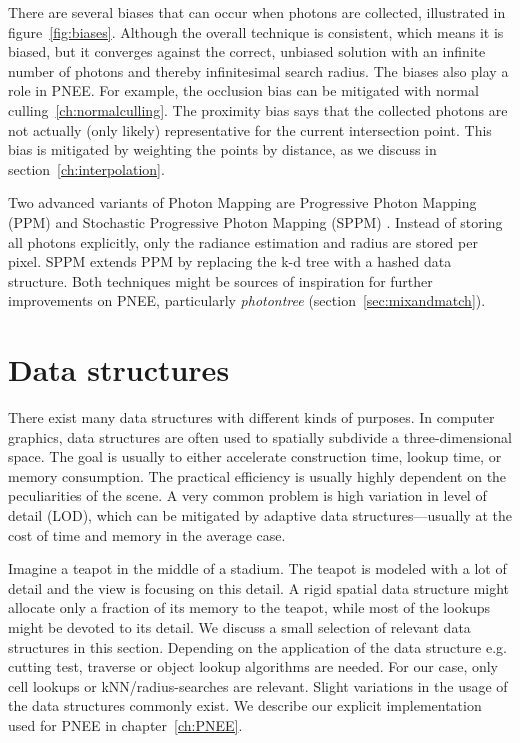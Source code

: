 There are several biases that can occur when photons are collected, illustrated in figure~\ref{fig:biases}. Although the overall technique is consistent, which means it is biased, but it converges against the correct, unbiased solution with an infinite number of photons and thereby infinitesimal search radius. The biases also play a role in PNEE. For example, the occlusion bias can be mitigated with normal culling~\ref{ch:normalculling}. The proximity bias says that the collected photons are not actually (only likely) representative for the current intersection point. This bias is mitigated by weighting the points by distance, as we discuss in section~\ref{ch:interpolation}. 

Two advanced variants of Photon Mapping are Progressive Photon Mapping (PPM) \parencite{DBLP:journals/tog/HachisukaOJ08} and Stochastic Progressive Photon Mapping (SPPM) \parencite{DBLP:journals/tog/HachisukaJ09}. Instead of storing all photons explicitly, only the radiance estimation and radius are stored per pixel. SPPM extends PPM by replacing the k-d tree with a hashed data structure. Both techniques might be  sources of inspiration for further improvements on PNEE, particularly \textit{photontree} (section~\ref{sec:mixandmatch}).

\section{Data structures}

There exist many data structures with different kinds of purposes. In computer graphics, data structures are often used to spatially subdivide a three-dimensional space. The goal is usually to either accelerate construction time, lookup time, or memory consumption. The practical efficiency is usually highly dependent on the peculiarities of the scene. A very common problem is high variation in level of detail (LOD), which can be mitigated by adaptive data structures---usually at the cost of time and memory in the average case. 

Imagine a teapot in the middle of a stadium. The teapot is modeled with a lot of detail and the view is focusing on this detail. A rigid spatial data structure might allocate only a fraction of its memory to the teapot, while most of the lookups might be devoted to its detail. We discuss a small selection of relevant data structures in this section. Depending on the application of the data structure e.g. cutting test, traverse or object lookup algorithms are needed. For our case, only cell lookups or kNN/radius-searches are relevant. Slight variations in the usage of the data structures commonly exist. We describe our explicit implementation used for PNEE in chapter~\ref{ch:PNEE}.

